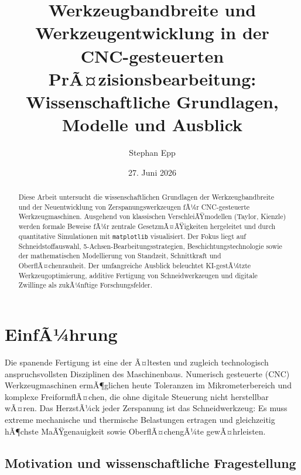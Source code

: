 ﻿\documentclass[a4paper,12pt]{article}
\title{Werkzeugbandbreite und Werkzeugentwicklung in der\\
CNC-gesteuerten PrÃ¤zisionsbearbeitung:\\
Wissenschaftliche Grundlagen, Modelle und Ausblick}
\author{Stephan Epp}
\date{27. Juni 2026}
\theoremstyle{definition}
\begin{document}
\maketitle

\begin{abstract}
Diese Arbeit untersucht die wissenschaftlichen Grundlagen der Werkzeugbandbreite
und der Neuentwicklung von Zerspanungswerkzeugen fÃ¼r CNC-gesteuerte Werkzeugmaschinen.
Ausgehend von klassischen VerschleiÃŸmodellen (Taylor, Kienzle) werden formale
Beweise fÃ¼r zentrale GesetzmÃ¤ÃŸigkeiten hergeleitet und durch quantitative Simulationen
mit \texttt{matplotlib} visualisiert. Der Fokus liegt auf Schneidstoffauswahl,
5-Achsen-Bearbeitungsstrategien, Beschichtungstechnologie sowie der mathematischen
Modellierung von Standzeit, Schnittkraft und OberflÃ¤chenrauheit. Der umfangreiche
Ausblick beleuchtet KI-gestÃ¼tzte Werkzeugoptimierung, additive Fertigung von
Schneidwerkzeugen und digitale Zwillinge als zukÃ¼nftige Forschungsfelder.
\end{abstract}

\tableofcontents
\newpage

\section{EinfÃ¼hrung}

Die spanende Fertigung ist eine der Ã¤ltesten und zugleich technologisch
anspruchsvollsten Disziplinen des Maschinenbaus. Numerisch gesteuerte (CNC)
Werkzeugmaschinen ermÃ¶glichen heute Toleranzen im Mikrometerbereich und
komplexe FreiformflÃ¤chen, die ohne digitale Steuerung nicht herstellbar wÃ¤ren.
Das HerzstÃ¼ck jeder Zerspanung ist das Schneidwerkzeug: Es muss extreme
mechanische und thermische Belastungen ertragen und gleichzeitig hÃ¶chste
MaÃŸgenauigkeit sowie OberflÃ¤chengÃ¼te gewÃ¤hrleisten.

\subsection{Motivation und wissenschaftliche Fragestellung}
\end{document}

